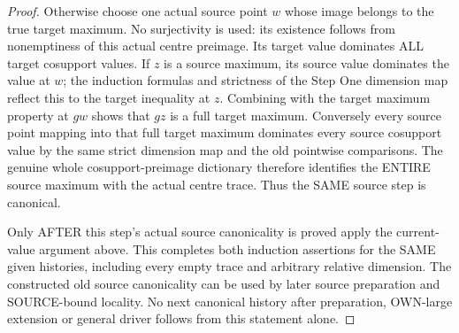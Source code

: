 \begin{proof}
Otherwise choose one actual source point $w$ whose image belongs to the
true target maximum. No surjectivity is used: its existence follows from
nonemptiness of this actual centre preimage. Its target value dominates
ALL target cosupport values. If $z$ is a source maximum, its source value
dominates the value at $w$; the induction formulas and strictness of the
Step One dimension map reflect this to the target inequality at $z$.
Combining with the target maximum property at $gw$ shows that $gz$ is a
full target maximum. Conversely every source point mapping into that
full target maximum dominates every source cosupport value by the same
strict dimension map and the old pointwise comparisons. The genuine
whole cosupport-preimage dictionary therefore identifies the ENTIRE
source maximum with the actual centre trace. Thus the SAME source step
is canonical.

Only AFTER this step's actual source canonicality is proved apply the
current-value argument above. This completes both induction assertions
for the SAME given histories, including every empty trace and arbitrary
relative dimension. The constructed old source canonicality can be used
by later source preparation and SOURCE-bound locality. No next canonical
history after preparation, OWN-large extension or general driver follows
from this statement alone.
\end{proof}
